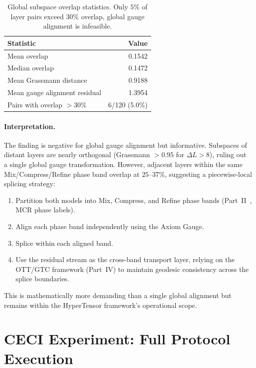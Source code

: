 \documentclass[11pt]{article}
\begin{document}
\begin{table}[h]\centering\small
\caption{Global subspace overlap statistics.  Only $5\%$ of layer
pairs exceed $30\%$ overlap, global gauge alignment is infeasible.}
\label{tab:overlap-global}
\begin{tabular}{@{}lr@{}}
\toprule
Statistic & Value \\
\midrule
Mean overlap & 0.1542 \\
Median overlap & 0.1472 \\
Mean Grassmann distance & 0.9188 \\
Mean gauge alignment residual & 1.3954 \\
Pairs with overlap $>30\%$ & 6/120 (5.0\%) \\
\bottomrule
\end{tabular}
\end{table}

\paragraph{Interpretation.}  The finding is negative for global gauge
alignment but informative.  Subspaces of distant layers are nearly
orthogonal (Grassmann $>0.95$ for $\Delta L > 8$), ruling out a single
global gauge transformation.  However, adjacent layers within the same
Mix/Compress/Refine phase band overlap at $25$--$37\%$, suggesting a
piecewise-local splicing strategy:

\begin{enumerate}
\item Partition both models into Mix, Compress, and Refine phase bands
      (Part~II~\cite{stewart2026gp}, MCR phase labels).
\item Align each phase band independently using the Axiom Gauge.
\item Splice within each aligned band.
\item Use the residual stream as the cross-band transport layer,
      relying on the OTT/GTC framework (Part~IV) to maintain geodesic
      consistency across the splice boundaries.
\end{enumerate}

This is mathematically more demanding than a single global alignment
but remains within the HyperTensor framework's operational scope.

\section{CECI Experiment: Full Protocol Execution}
\label{sec:experiment}
\end{document}
